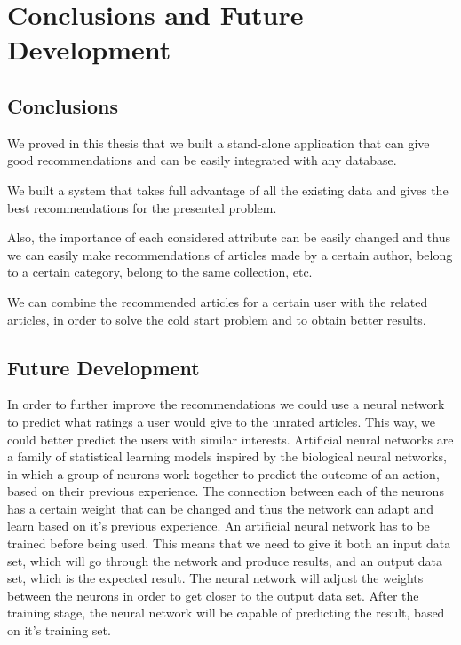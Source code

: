 \chapter{Conclusions and Future Development}
\label{chapter:conclusions-future-development}

\section{Conclusions} 
\label{sec:conclusions}
We proved in this thesis that we built a stand-alone application that can give good recommendations and can be easily integrated with any database.

We built a system that takes full advantage of all the existing data and gives the best recommendations for the presented problem.

Also, the importance of each considered attribute can be easily changed and thus we can easily make recommendations of articles made by a certain author, belong to a certain category, belong to the same collection, etc. 

We can combine the recommended articles for a certain user with the related articles, in order to solve the cold start problem and to obtain better results.

\section{Future Development} 
\label{sec:future-development}

In order to further improve the recommendations we could use a neural network to predict what ratings a user would give to the unrated articles\cite{netflix-recommender}. This way, we could better predict the users with similar interests.
Artificial neural networks are a family of statistical learning models inspired by the biological neural networks, in which a group of neurons work together to predict the outcome of an action, based on their previous experience. The connection between each of the neurons has a certain weight that can be changed and thus the network can adapt and learn based on it's previous experience. An artificial neural network has to be trained before being used. This means that we need to give it both an input data set, which will go through the network and produce results, and an output data set, which is the expected result. The neural network will adjust the weights between the neurons in order to get closer to the output data set. After the training stage, the neural network will be capable of predicting the result, based on it's training set.

